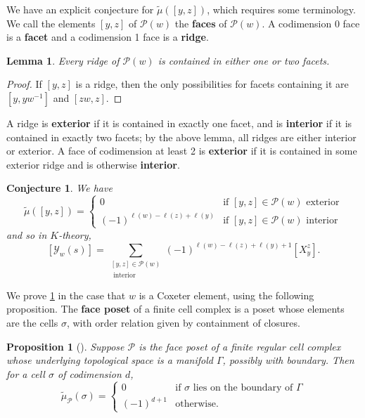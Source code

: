 \documentclass[11pt]{amsart}
\newtheorem{lemma}[Thm]{Lemma}
\newtheorem{proposition}[Thm]{Proposition}
\newtheorem{conjecture}[Thm]{Conjecture}
\theoremstyle{definition}
\newcommand\defn[1]{{\bf #1}}
\def\calP{\mathcal{P}}
\def\mob{\tilde{\mu}}
\newcommand\calY{{\mathcal Y}}
\begin{document}
 We have an explicit conjecture for $\mob([y,z])$, which requires some terminology. We call the elements $[y,z]$ of $\calP(w)$ the \defn{faces} of $\calP(w)$. A codimension 0 face is a \defn{facet} and a codimension 1 face is a \defn{ridge}.
 
 \begin{lemma}\label{lem:ridge-in-one-or-two-facets}
 	Every ridge of $\calP(w)$ is contained in either one or two facets.
 \end{lemma}
 \begin{proof}
 	If $[y,z]$ is a ridge, then the only possibilities for facets containing it are $[y, yw^{-1}]$ and $[zw, z]$.
 \end{proof}
 
 A ridge is \textbf{exterior} if it is contained in exactly one facet, and is \textbf{interior} if it is contained in exactly two facets; by the above lemma, all ridges are either interior or exterior. A face of codimension at least 2 is \textbf{exterior} if it is contained in some exterior ridge and is otherwise \textbf{interior}.
 
 \begin{conjecture}\label{conj:mobius-fcn-and-k-thry-formula}
 	We have 
 	\[\mob([y,z]) = \begin{cases}
 		0 & \text{if $[y,z] \in \calP(w)$ exterior}\\
 		(-1)^{\ell(w)-\ell(z)+ \ell(y)} & \text{if $[y,z] \in \calP(w)$ interior}
 	\end{cases}\]
 	and so in $K$-theory,
 	\[[\calY_{w}(s)] = \sum_{\substack{[y,z]\in \calP(w) \\ \text{ interior }}} (-1)^{\ell(w)-\ell(z)+ \ell(y) +1} [X_y^z].\]
 \end{conjecture}
 
 We prove \cref{conj:mobius-fcn-and-k-thry-formula} in the case that $w$ is a Coxeter element, using the following proposition. The \defn{face poset} of a finite cell complex is a poset whose elements are the cells $\sigma$, with order relation given by containment of closures.
 
 \begin{proposition}[{\cite[Proposition 3.8.9]{Stanley-EC1}}]\label{prop:mob-fcn-for-face-poset}
 	Suppose $\calP$ is the face poset of a finite regular cell complex whose underlying topological space is a manifold $\Gamma$, possibly with boundary. Then for a cell $\sigma$ of codimension $d$,
 	\[\mob_{\calP}(\sigma) = \begin{cases}
 		0 & \text{if $\sigma$ lies on the boundary of }\Gamma\\
 		(-1)^{d+1} & \text{otherwise.}
 	\end{cases}\]
 \end{proposition}
 
\end{document}
